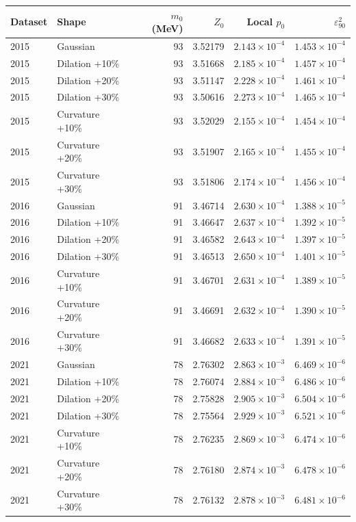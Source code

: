 \begin{tabular}{llrrrr}
\toprule
Dataset & Shape & $m_0$ (MeV) & $Z_0$ & Local $p_0$ & $\varepsilon^2_{90}$ \\
\midrule
2015 & Gaussian & 93 & 3.52179 & $2.143\times10^{-4}$ & $1.453\times10^{-4}$ \\
2015 & Dilation +10\% & 93 & 3.51668 & $2.185\times10^{-4}$ & $1.457\times10^{-4}$ \\
2015 & Dilation +20\% & 93 & 3.51147 & $2.228\times10^{-4}$ & $1.461\times10^{-4}$ \\
2015 & Dilation +30\% & 93 & 3.50616 & $2.273\times10^{-4}$ & $1.465\times10^{-4}$ \\
2015 & Curvature +10\% & 93 & 3.52029 & $2.155\times10^{-4}$ & $1.454\times10^{-4}$ \\
2015 & Curvature +20\% & 93 & 3.51907 & $2.165\times10^{-4}$ & $1.455\times10^{-4}$ \\
2015 & Curvature +30\% & 93 & 3.51806 & $2.174\times10^{-4}$ & $1.456\times10^{-4}$ \\
2016 & Gaussian & 91 & 3.46714 & $2.630\times10^{-4}$ & $1.388\times10^{-5}$ \\
2016 & Dilation +10\% & 91 & 3.46647 & $2.637\times10^{-4}$ & $1.392\times10^{-5}$ \\
2016 & Dilation +20\% & 91 & 3.46582 & $2.643\times10^{-4}$ & $1.397\times10^{-5}$ \\
2016 & Dilation +30\% & 91 & 3.46513 & $2.650\times10^{-4}$ & $1.401\times10^{-5}$ \\
2016 & Curvature +10\% & 91 & 3.46701 & $2.631\times10^{-4}$ & $1.389\times10^{-5}$ \\
2016 & Curvature +20\% & 91 & 3.46691 & $2.632\times10^{-4}$ & $1.390\times10^{-5}$ \\
2016 & Curvature +30\% & 91 & 3.46682 & $2.633\times10^{-4}$ & $1.391\times10^{-5}$ \\
2021 & Gaussian & 78 & 2.76302 & $2.863\times10^{-3}$ & $6.469\times10^{-6}$ \\
2021 & Dilation +10\% & 78 & 2.76074 & $2.884\times10^{-3}$ & $6.486\times10^{-6}$ \\
2021 & Dilation +20\% & 78 & 2.75828 & $2.905\times10^{-3}$ & $6.504\times10^{-6}$ \\
2021 & Dilation +30\% & 78 & 2.75564 & $2.929\times10^{-3}$ & $6.521\times10^{-6}$ \\
2021 & Curvature +10\% & 78 & 2.76235 & $2.869\times10^{-3}$ & $6.474\times10^{-6}$ \\
2021 & Curvature +20\% & 78 & 2.76180 & $2.874\times10^{-3}$ & $6.478\times10^{-6}$ \\
2021 & Curvature +30\% & 78 & 2.76132 & $2.878\times10^{-3}$ & $6.481\times10^{-6}$ \\
\bottomrule
\end{tabular}
